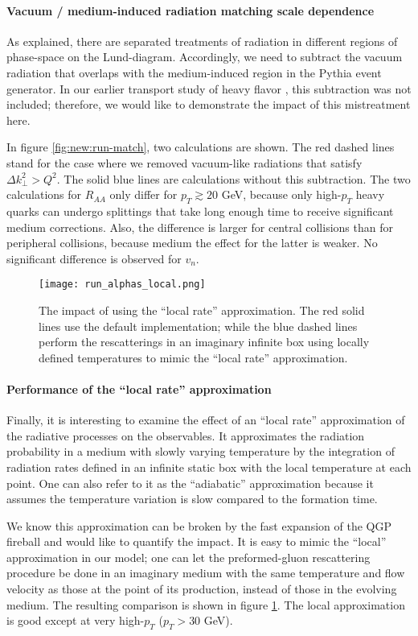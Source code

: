 \paragraph{Vacuum / medium-induced radiation matching scale dependence}
As explained, there are separated treatments of radiation in different regions of phase-space on the Lund-diagram.
Accordingly, we need to subtract the vacuum radiation that overlaps with the medium-induced region in the Pythia event generator.
In our earlier transport study of heavy flavor \cite{Ke:2018tsh}, this subtraction was not included; therefore, we would like to demonstrate the impact of this mistreatment here.

In figure \ref{fig:new:run-match}, two calculations are shown. 
The red dashed lines stand for the case where we removed vacuum-like radiations that satisfy $\Delta k_\perp^2 > Q^2$.
The solid blue lines are calculations without this subtraction.
The two calculations for $R_{AA}$ only differ for $p_T\gtrsim 20$ GeV, because only high-$p_T$ heavy quarks can undergo splittings that take long enough time to receive significant medium corrections.
Also, the difference is larger for central collisions than for peripheral collisions, because medium the effect for the latter is weaker.
No significant difference is observed for $v_n$.

\begin{figure}
\singlespacing
\centering
\texttt{[image: run\_alphas\_local.png]}
\caption[The impact of using the ``local rate'' approximation. The red]{The impact of using the ``local rate'' approximation. The red solid lines use the default implementation; while the blue dashed lines perform the rescatterings in an imaginary infinite box using locally defined temperatures to mimic the ``local rate'' approximation.}
\label{fig:new:run-local}
\end{figure}

\paragraph{Performance of the ``local rate'' approximation}
Finally, it is interesting to examine the effect of an ``local rate'' approximation of the radiative processes on the observables.
It approximates the radiation probability in a medium with slowly varying temperature by the integration of radiation rates defined in an infinite static box with the local temperature at each point.
One can also refer to it as the ``adiabatic'' approximation because it assumes the temperature variation is slow compared to the formation time.

We know this approximation can be broken by the fast expansion of the QGP fireball and would like to quantify the impact.
It is easy to mimic the ``local'' approximation in our model; one can let the preformed-gluon rescattering procedure be done in an imaginary medium with the same temperature and flow velocity as those at the point of its production, instead of those in the evolving medium.
The resulting comparison is shown in figure \ref{fig:new:run-local}.
The local approximation is good except at very high-$p_T$ ($p_T > 30$ GeV).

